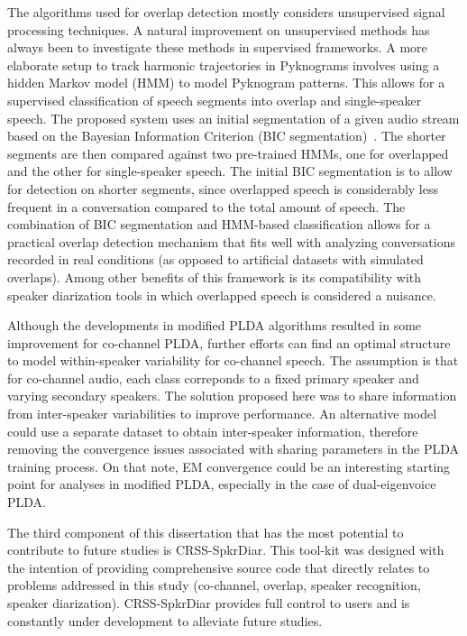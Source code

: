 The algorithms used for overlap detection mostly considers unsupervised signal processing techniques. 
A natural improvement on unsupervised methods has always been to investigate these methods in supervised frameworks. 
A more elaborate setup to track harmonic trajectories in Pyknograms involves using a hidden Markov model (HMM) to model Pyknogram patterns. 
This allows for a supervised classification of speech segments into overlap and single-speaker speech. 
The proposed system uses an initial segmentation of a given audio stream based on the Bayesian Information Criterion (BIC segmentation)~\cite{BIC}. 
The shorter segments are then compared against two pre-trained HMMs, one for overlapped and the other for single-speaker speech. 
The initial BIC segmentation is to allow for detection on shorter segments, since overlapped speech is considerably less frequent in a conversation compared to the total amount of speech. 
The combination of BIC segmentation and HMM-based classification allows for a practical overlap detection mechanism that fits well with analyzing conversations recorded in real conditions (as opposed to artificial datasets with simulated overlaps). 
Among other benefits of this framework is its compatibility with speaker diarization tools in which overlapped speech is considered a nuisance. 

Although the developments in modified PLDA algorithms resulted in some improvement for co-channel PLDA, further efforts can find an optimal structure to model within-speaker variability for co-channel speech. 
The assumption is that for co-channel audio, each class correponds to a fixed primary speaker and varying secondary speakers. 
The solution proposed here was to share information from inter-speaker variabilities to improve performance. 
An alternative model could use a separate dataset to obtain inter-speaker information, therefore removing the convergence issues associated with sharing parameters in the PLDA training process. 
On that note, EM convergence could be an interesting starting point for analyses in modified PLDA, especially in the case of dual-eigenvoice PLDA. 

The third component of this dissertation that has the most potential to contribute to future studies is CRSS-SpkrDiar. 
This tool-kit was designed with the intention of providing comprehensive source code that directly relates to problems addressed in this study (co-channel, overlap, speaker recognition, speaker diarization). 
CRSS-SpkrDiar provides full control to users and is constantly under development to alleviate future studies. 






